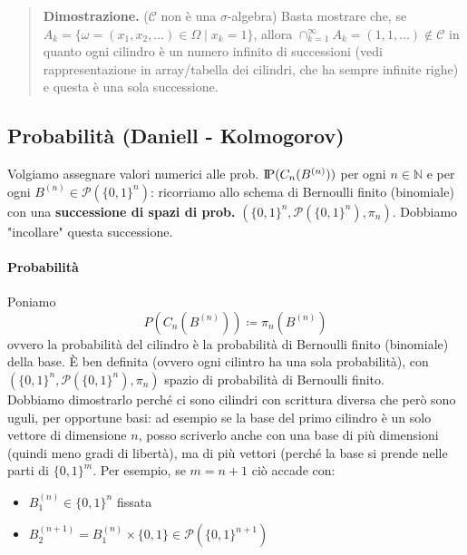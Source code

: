 \documentclass[a4paper,10pt]{article}
\newcommand{\pr}{\text{I\kern-0.15em P}} %
\theoremstyle{remark}
\theoremstyle{definition}
\newenvironment{dimo}{\begin{quote}\textbf{Dimostrazione.}}{\end{quote}} %
\begin{document}
\begin{itemize}
\begin{dimo}
    ($\mathscr{C}$ non è una $\sigma$-algebra) Basta mostrare che, se $A_k=\{\omega =(x_1,x_2,\dots) \in \Omega \mid x_k=1\}$, allora $\cap_{k=1}^\infty A_k=(1,1,\dots)\notin \mathscr{C}$ in quanto ogni cilindro è un numero infinito di successioni (vedi rappresentazione in array/tabella dei cilindri, che ha sempre infinite righe) e questa è una sola successione.
\end{dimo}

\end{itemize}


\subsection*{Probabilità (Daniell - Kolmogorov)}

Volgiamo assegnare valori numerici alle prob. $\pr(C_n(B^{(n)}))$ per ogni $n\in\mathbb{N}$ e per ogni $B^{(n)} \in \mathscr{P}(\{0,1\}^n)$: ricorriamo allo schema di Bernoulli finito (binomiale) con una \textbf{successione di spazi di prob.} $(\{ 0,1\} ^{n},\mathscr{P}(\{ 0,1\} ^{n}),\pi_{n})$. Dobbiamo "incollare"  questa successione.

\paragraph{Probabilità} Poniamo 
$$P(C_{n}(B^{(n)}))\coloneqq\pi_{n}(B^{(n)})$$
ovvero la probabilità del cilindro è la probabilità di Bernoulli finito (binomiale) della base. È ben definita (ovvero ogni cilintro ha una sola probabilità), con $(\{ 0,1\} ^{n},\mathscr{P}(\{ 0,1\} ^{n}),\pi_{n})$ spazio di probabilità di Bernoulli finito. \\
Dobbiamo dimostrarlo perché ci sono cilindri con scrittura diversa che però sono uguli, per opportune basi: ad esempio se la base del primo cilindro è un solo vettore di dimensione $n$, posso scriverlo anche con una base di più dimensioni (quindi meno gradi di libertà), ma di più vettori (perché la base si prende nelle parti di $\{0,1\}^m$. Per esempio, se $m=n+1$ ciò accade con: 
\begin{itemize}
    \item $B_1^{(n)} \in \{0,1\}^n$ fissata
    \item $B_2^{(n+1)} = B_1^{(n)} \times \{0,1\} \in \mathscr{P}(\{0,1\}^{n+1})$
\end{itemize}
\end{document}
